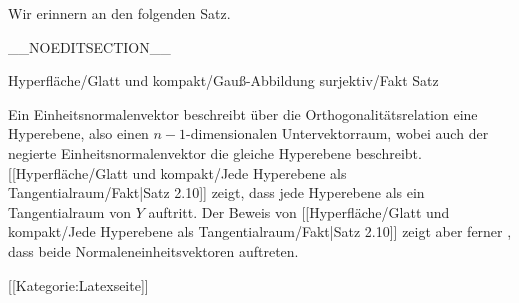 Wir erinnern an den folgenden Satz.

{

\faktzusatz {}
\faktzusatz {}

}
__NOEDITSECTION__

{Hyperfläche/Glatt und kompakt/Gauß-Abbildung surjektiv/Fakt}
{Satz}
{}
{

\faktzusatz {}
\faktzusatz {}

}
{

Ein Einheitsnormalenvektor beschreibt über die Orthogonalitätsrelation eine Hyperebene, also einen $n-1$-dimensionalen Untervektorraum, wobei auch der negierte Einheitsnormalenvektor die gleiche Hyperebene beschreibt. [[Hyperfläche/Glatt und kompakt/Jede Hyperebene als Tangentialraum/Fakt|Satz 2.10]]
zeigt, dass jede Hyperebene als ein Tangentialraum von $Y$ auftritt. Der Beweis von
[[Hyperfläche/Glatt und kompakt/Jede Hyperebene als Tangentialraum/Fakt|Satz 2.10]]
zeigt aber ferner
 {} {,}
dass beide Normaleneinheitsvektoren auftreten.

}

 [[Kategorie:Latexseite]]
